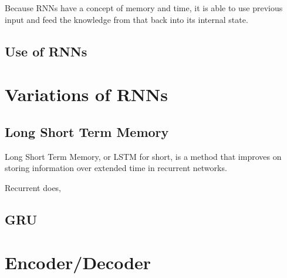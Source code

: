 
Because RNNs have a concept of memory and time, it is able to use previous input and feed the knowledge from that back into its internal state. 

\subsection{Use of RNNs}


\section{Variations of RNNs}

\subsection{Long Short Term Memory}
Long Short Term Memory, or LSTM for short, is a method that improves on storing information over extended time in recurrent networks. 

Recurrent does, 

\cite{hochreiter1997long}

\subsection{GRU}


\section{Encoder/Decoder}

\cite{rocktaschel2015reasoning}
\fi